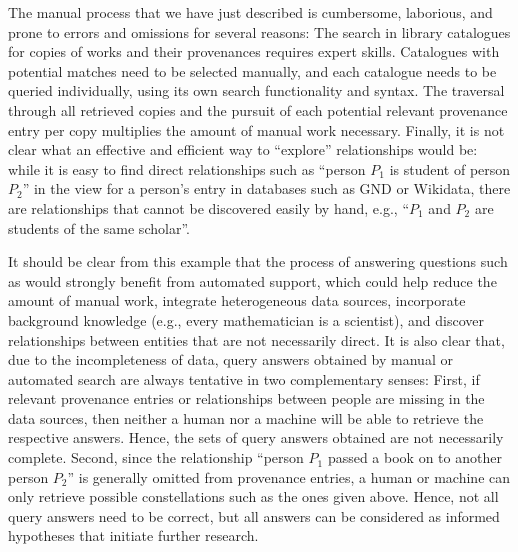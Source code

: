 The manual process that we have just described is cumbersome, laborious, and prone to errors and omissions for several reasons:
The search in library catalogues for copies of works and their provenances requires expert skills.
Catalogues with potential matches need to be selected manually,
and each catalogue needs to be queried individually, using its own search functionality and syntax. 
The traversal through all retrieved copies and the pursuit of each potential relevant provenance entry per copy 
multiplies the amount of manual work necessary.
Finally, it is not clear what an effective and efficient way to ``explore'' relationships would be:
while it is easy to find direct relationships such as ``person $P_1$ is student of person $P_2$'' in the view for a person's entry
in databases such as GND or Wikidata, there are relationships that cannot be discovered easily by hand,
e.g., ``$P_1$ and $P_2$ are students of the same scholar''.

It should be clear from this example that the process of answering questions such as 
would strongly benefit from automated support, which could help reduce the amount of manual work, integrate heterogeneous data sources,
incorporate background knowledge (e.g., every mathematician is a scientist),
and discover relationships between entities that are not necessarily direct.
It is also clear that, due to the incompleteness of data, query answers obtained by manual or automated search
are always tentative in two complementary senses: First, if relevant provenance entries or relationships between people are missing
in the data sources, then neither a human nor a machine will be able to retrieve the respective answers. Hence, the sets of query answers obtained
are not necessarily complete.
Second, since the relationship ``person $P_1$ passed a book on to another person $P_2$'' is generally omitted from
provenance entries, a human or machine can only retrieve possible constellations such as the ones
given above. Hence, not all query answers need to be correct, but all answers can be considered
as informed hypotheses that initiate further research.


